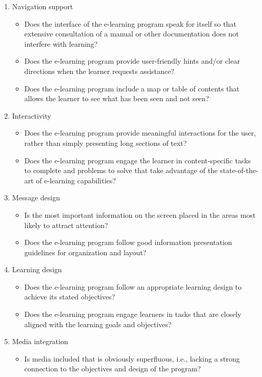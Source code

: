 \begin{enumerate}
\item Navigation support 
\begin{itemize}
\item Does the interface of the e-learning program speak for itself so that extensive consultation of a manual or other documentation does not interfere with learning? 
\item Does the e-learning program provide user-friendly hints and/or clear directions when the learner requests assistance? 
\item Does the e-learning program include a map or table of contents that allows the learner to see what has been seen and not seen? 
\end{itemize}
\item Interactivity
\begin{itemize}
\item Does the e-learning program provide meaningful interactions for the user, rather than simply presenting long sections of text? 
\item Does the e-learning program engage the learner in content-specific tasks to complete and problems to solve that take advantage of the state-of-the-art of e-learning capabilities?
\end{itemize}
\item Message design 
\begin{itemize} 
\item Is the most important information on the screen placed in the areas most likely to attract attention?
\item Does the e-learning program follow good information presentation guidelines for organization and layout?
\end{itemize}
\item Learning design 
\begin{itemize}
\item Does the e-learning program follow an appropriate learning design to achieve its stated objectives?
\item Does the e-learning program engage learners in tasks that are closely aligned with the learning goals and objectives?
\end{itemize} 
\item Media integration
\begin{itemize}
\item Is media included that is obviously superfluous, i.e., lacking a strong connection to the objectives and design of the program?

\end{itemize}
\end{enumerate}

